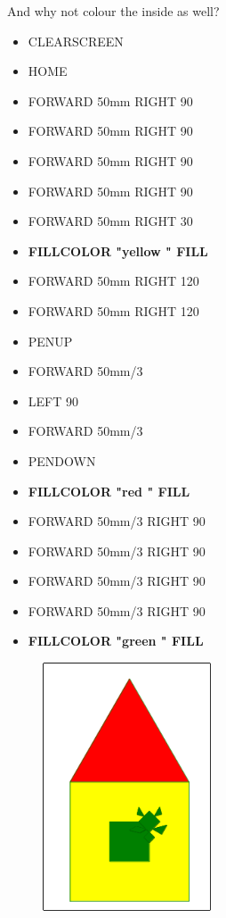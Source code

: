 \vskip 1cm

And why not colour the inside as well?


\vskip 1cm

\begin{scriptsize}
\begin{minipage}{0.40\textwidth}
\begin{itemize}[itemsep=-3pt,parsep=2pt]
\item[] CLEARSCREEN            
\item[] HOME
\item[] FORWARD 50mm RIGHT 90
\item[] FORWARD 50mm RIGHT 90
\item[] FORWARD 50mm RIGHT 90
\item[] FORWARD 50mm RIGHT 90
\item[] FORWARD 50mm RIGHT 30
\item[] \textbf{FILLCOLOR  "yellow " FILL}
\item[] FORWARD 50mm RIGHT 120
\item[] FORWARD 50mm RIGHT 120
\item[] PENUP
\item[] FORWARD 50mm/3
\item[] LEFT 90
\item[] FORWARD 50mm/3
\item[] PENDOWN
\item[] \textbf{FILLCOLOR  "red " FILL}
\item[] FORWARD 50mm/3 RIGHT 90
\item[] FORWARD 50mm/3 RIGHT 90
\item[] FORWARD 50mm/3 RIGHT 90
\item[] FORWARD 50mm/3 RIGHT 90
\item[] \textbf{FILLCOLOR  "green " FILL}
\end{itemize}
\end{minipage}
\end{scriptsize}
\begin{minipage}{0.4\textwidth}
\begin{figure}[H]
   \includegraphics[width=5.0cm,trim=4 4 8 4,clip]{./images/disegnare/disegnare-11.png}
   \label{dis-11}
\end{figure}
\end{minipage} \hfill

